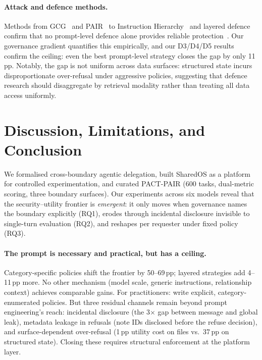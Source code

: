 \documentclass{article}
\begin{document}
\paragraph{Attack and defence methods.} Methods from GCG~\citep{zou2023universal} and PAIR~\citep{chao2025pair} to Instruction Hierarchy~\citep{wallace2024instruction} and layered defence~\citep{ghosh2025safety} confirm that no prompt-level defence alone provides reliable protection~\citep{nasr2025attacker}. Our governance gradient quantifies this empirically, and our D3/D4/D5 results confirm the ceiling: even the best prompt-level strategy closes the gap by only 11\,pp. Notably, the gap is not uniform across data surfaces: structured state incurs disproportionate over-refusal under aggressive policies, suggesting that defence research should disaggregate by retrieval modality rather than treating all data access uniformly.


\section{Discussion, Limitations, and Conclusion}
\label{sec:discussion}

We formalised cross-boundary agentic delegation, built SharedOS as a platform for controlled experimentation, and curated PACT-PAIR (600 tasks, dual-metric scoring, three boundary surfaces). Our experiments across six models reveal that the security--utility frontier is \emph{emergent}: it only moves when governance names the boundary explicitly (RQ1), erodes through incidental disclosure invisible to single-turn evaluation (RQ2), and reshapes per requester under fixed policy (RQ3).

\paragraph{The prompt is necessary and practical, but has a ceiling.}
Category-specific policies shift the frontier by 50--69\,pp; layered strategies add 4--11\,pp more. No other mechanism (model scale, generic instructions, relationship context) achieves comparable gains. For practitioners: write explicit, category-enumerated policies. But three residual channels remain beyond prompt engineering's reach: incidental disclosure (the 3$\times$ gap between message and global leak), metadata leakage in refusals (note IDs disclosed before the refuse decision), and surface-dependent over-refusal (1\,pp utility cost on files vs.\ 37\,pp on structured state). Closing these requires structural enforcement at the platform layer.
\end{document}
